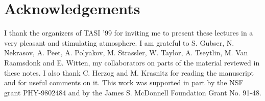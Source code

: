 \documentclass[12pt]{article}
\begin{document}
\section*{Acknowledgements}
I thank the organizers of TASI '99 for inviting me to present
these lectures in a very pleasant and stimulating atmosphere.
I am grateful to S. Gubser, N. Nekrasov, A. Peet, A. Polyakov, 
M. Strassler, W. Taylor, A. Tseytlin, M. Van Raamsdonk and
E. Witten, my collaborators on parts of the material reviewed in these
notes. I also thank C. Herzog and M. Krasnitz for reading the manuscript and
for useful comments on it.
This work  was supported in part by the NSF grant PHY-9802484 
and by the James S. McDonnell Foundation Grant No. 91-48.  

 
\end{document}
